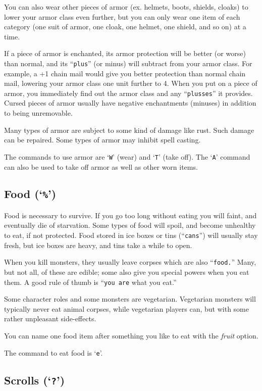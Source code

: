 You can also wear other pieces of armor (ex. helmets, boots, shields, cloaks)
to lower your armor class even further, but you can only wear one item
of each category (one suit of armor, one cloak, one helmet, one
shield, and so on) at a time.

If a piece of armor is enchanted, its armor protection will be better
(or worse) than normal, and its ``{\tt plus}'' (or minus) will subtract from
your armor class.  For example, a +1 chain mail would give you
better protection than normal chain mail, lowering your armor class one
unit further to 4.  When you put on a piece of armor, you immediately
find out the armor class and any ``{\tt plusses}'' it provides.  Cursed
pieces of armor usually have negative enchantments (minuses) in
addition to being unremovable.

Many types of armor are subject to some kind of damage like rust.  Such
damage can be repaired.  Some types of armor may inhibit spell casting.

The commands to use armor are `{\tt W}' (wear) and `{\tt T}' (take off).
The `{\tt A}' command can also be used to take off armor as well as other
worn items.
\subsection*{Food (`{\tt \%}')}


Food is necessary to survive.  If you go too long without eating you
will faint, and eventually die of starvation.  Some types of food will
spoil, and become unhealthy to eat, if not protected.  Food stored in
ice boxes or tins (``{\tt cans}'') will usually stay fresh, but
ice boxes are heavy, and tins take a while to open.

When you kill monsters, they usually leave corpses which are also
``{\tt food.}''  Many, but not all, of these are edible; some also give you
special powers when you eat them.  A good rule of thumb is ``{\tt you are}
what you eat.''

Some character roles and some monsters are vegetarian.  Vegetarian monsters
will typically never eat animal corpses, while vegetarian players can,
but with some rather unpleasant side-effects.

You can name one food item after something you like to eat with the
{\it fruit\/} 
option.

The command to eat food is `{\tt e}'.
\subsection*{Scrolls (`{\tt ?}')}

